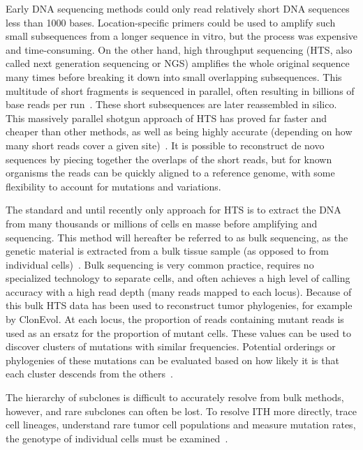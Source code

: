 \documentclass[../../main.tex]{subfiles}
\begin{document}
Early DNA sequencing methods could only read relatively short DNA sequences less than 1000 bases.
Location-specific primers could be used to amplify such small subsequences from a longer sequence in vitro, but the process was expensive and time-consuming.
On the other hand, high throughput sequencing (HTS, also called next generation sequencing or NGS) amplifies the whole original sequence many times before breaking it down into small overlapping subsequences.
This multitude of short fragments is sequenced in parallel, often resulting in billions of base reads per run~\cite{sequencesequencers}.
These short subsequences are later reassembled in silico.
This massively parallel shotgun approach of HTS has proved far faster and cheaper than other methods, as well as being highly accurate (depending on how many short reads cover a given site)~\cite{massivelyparallel}.
It is possible to reconstruct de novo sequences by piecing together the overlaps of the short reads, but for known organisms the reads can be quickly aligned to a reference genome, with some flexibility to account for mutations and variations.

The standard and until recently only approach for HTS is to extract the DNA from many thousands or millions of cells en masse before amplifying and sequencing.
This method will hereafter be referred to as bulk sequencing, as the genetic material is extracted from a bulk tissue sample (as opposed to from individual cells)~\cite{SCSadvance}.
Bulk sequencing is very common practice, requires no specialized technology to separate cells, and often achieves a high level of calling accuracy with a high read depth (many reads mapped to each locus).
Because of this bulk HTS data has been used to reconstruct tumor phylogenies, for example by ClonEvol.
At each locus, the proportion of reads containing mutant reads is used as an ersatz for the proportion of mutant cells.
These values can be used to discover clusters of mutations with similar frequencies. 
Potential orderings or phylogenies of these mutations can be evaluated based on how likely it is that each cluster descends from the others~\cite{clonevol}.

The hierarchy of subclones is difficult to accurately resolve from bulk methods, however, and rare subclones can often be lost.
To resolve ITH more directly, trace cell lineages, understand rare tumor cell populations and measure mutation rates, the genotype of individual cells must be examined~\cite{onecelltime}.
\end{document}
